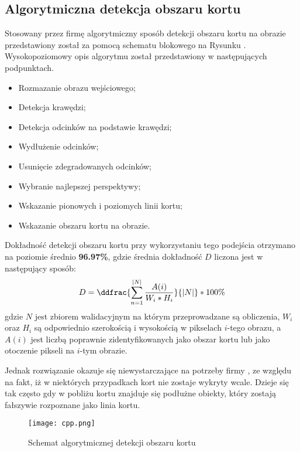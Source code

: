 \subsection{Algorytmiczna detekcja obszaru kortu}
\label{sec:aglorytmiczna_detekcja}

Stosowany przez firmę \blue{} algorytmiczny sposób detekcji obszaru kortu na obrazie przedstawiony został za pomocą schematu blokowego na Rysunku . Wysokopoziomowy opis algorytmu został przedstawiony w następujących podpunktach.

\begin{itemize}
  \item Rozmazanie obrazu wejściowego; 
  \item Detekcja krawędzi;
  \item Detekcja odcinków na podstawie krawędzi;
  \item Wydłużenie odcinków;
  \item Usunięcie zdegradowanych odcinków;
  \item Wybranie najlepszej perspektywy;
  \item Wskazanie pionowych i poziomych linii kortu;
  \item Wskazanie obszaru kortu na obrazie.
\end{itemize}

Dokładność detekcji obszaru kortu przy wykorzystaniu tego podejścia otrzymano na poziomie średnio \textbf{96.97\%}, gdzie średnia dokładność $D$ liczona jest w następujący sposób:
\vspace{-3pt} 
\[
\vspace{-3pt}
D = \ddfrac{\sum_{n = 1}^{|N|} \frac{A(i)}{W_{i} * H_{i}}}{|N|} * 100\%
\vspace{-3pt}
\]
gdzie $N$ jest zbiorem walidacyjnym na którym przeprowadzane są obliczenia, $W_{i}$ oraz $H_{i}$ są odpowiednio szerokością i wysokością w pikselach $i$-tego obrazu, a $A(i)$ jest liczbą poprawnie zidentyfikowanych jako obszar kortu lub jako otoczenie pikseli na $i$-tym obrazie.

Jednak rozwiązanie okazuje się niewystarczające na potrzeby firmy \blue{}, ze względu na fakt, iż w niektórych przypadkach kort nie zostaje wykryty wcale. Dzieje się tak często gdy w pobliżu kortu znajduje się podłużne obiekty, który zostają fałszywie rozpoznane jako linia kortu.

\begin{figure}[h]
  \centering
  \caption{Schemat algorytmicznej detekcji obszaru kortu}
  \texttt{[image: cpp.png]}
  \label{fig:algcpp}
\end{figure}
